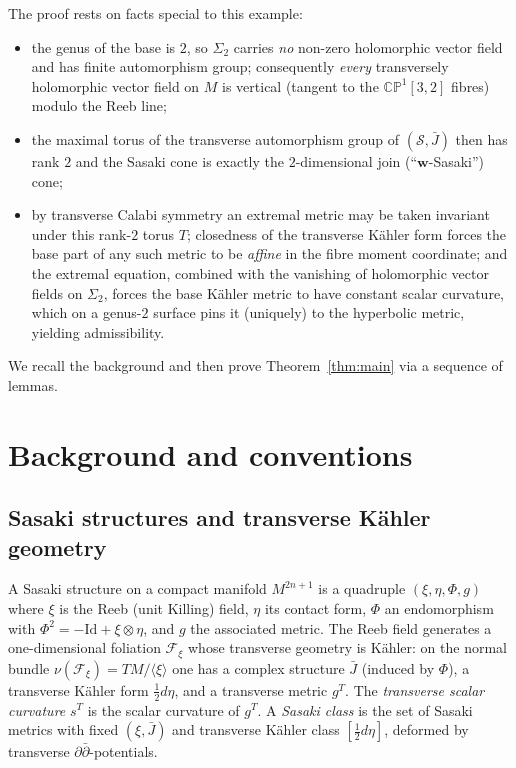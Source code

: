 \documentclass{amsart}
\theoremstyle{definition}
\begin{document}
The proof rests on facts special to this example:
\begin{itemize}
\item[(A)] the genus of the base is $2$, so $\Sigma_2$ carries
\emph{no} non-zero holomorphic vector field and has finite automorphism group;
consequently \emph{every} transversely holomorphic vector field on $M$ is
vertical (tangent to the $\mathbb{CP}^1[3,2]$ fibres) modulo the Reeb line;
\item[(B)] the maximal torus of the transverse automorphism group of
$(\mathcal S,\bar J)$ then has rank $2$ and the Sasaki cone is exactly the
$2$-dimensional join (``$\mathbf w$-Sasaki'') cone;
\item[(C)] by transverse Calabi symmetry an extremal metric may be taken
invariant under this rank-$2$ torus $T$; closedness of the transverse K\"ahler
form forces the base part of any such metric to be \emph{affine} in the fibre
moment coordinate; and the extremal equation, combined with the vanishing of
holomorphic vector fields on $\Sigma_2$, forces the base K\"ahler metric to have
constant scalar curvature, which on a genus-$2$ surface pins it (uniquely) to
the hyperbolic metric, yielding admissibility.
\end{itemize}
We recall the background and then prove Theorem~\ref{thm:main} via a sequence of
lemmas.

\section{Background and conventions}\label{sec:bg}

\subsection{Sasaki structures and transverse K\"ahler geometry}
A Sasaki structure on a compact manifold $M^{2n+1}$ is a quadruple
$(\xi,\eta,\Phi,g)$ where $\xi$ is the Reeb (unit Killing) field, $\eta$ its
contact form, $\Phi$ an endomorphism with $\Phi^2=-\mathrm{Id}+\xi\otimes\eta$,
and $g$ the associated metric. The Reeb field generates a one-dimensional
foliation $\mathcal F_\xi$ whose transverse geometry is K\"ahler: on the normal
bundle $\nu(\mathcal F_\xi)=TM/\langle\xi\rangle$ one has a complex structure
$\bar J$ (induced by $\Phi$), a transverse K\"ahler form $\frac12 d\eta$, and a
transverse metric $g^T$. The \emph{transverse scalar curvature} $s^T$ is the
scalar curvature of $g^T$. A \emph{Sasaki class} is the set of Sasaki metrics
with fixed $(\xi,\bar J)$ and transverse K\"ahler class $[\frac12 d\eta]$,
deformed by transverse $\partial\bar\partial$-potentials.
\end{document}
